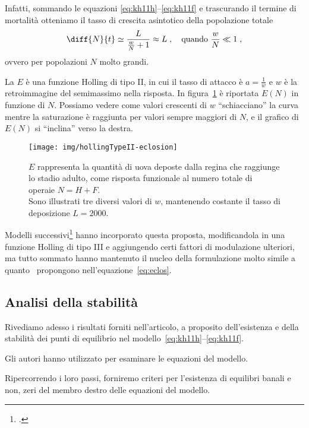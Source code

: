 Infatti, sommando le equazioni \eqref{eq:kh11h}--\eqref{eq:kh11f} e trascurando il termine di mortalità otteniamo
il tasso di crescita asintotico della popolazione totale
$$\diff{N}{t} \simeq \frac{L}{ \frac{w}{N} + 1} \approx L \; , \quad \text{quando } \frac{w}{N} \ll 1 \; ,$$
ovvero per popolazioni $N$ molto grandi.

La $E$ è una funzione Holling di tipo II, in cui il tasso di attacco è $a=\frac{1}{w}$ e $w$
è la retroimmagine del semimassimo nella risposta. In figura~\ref{img:eclos} è riportata $E(N)$ in funzione di $N$.
Possiamo vedere come valori
crescenti di $w$ ``schiacciano'' la curva mentre la saturazione è raggiunta per valori sempre maggiori di $N$,
e il grafico di $E(N)$ si ``inclina'' verso la destra.

\begin{figure}[pbh]
    \centering
    \texttt{[image: img/hollingTypeII-eclosion]}

    \caption[Schiusa, Holling tipo II]{$E$ rappresenta la quantità di uova deposte dalla regina che raggiunge lo
    stadio adulto, come risposta funzionale al numero totale di operaie $N=H+F$.
    \\
    Sono illustrati tre diversi valori di $w$, mantenendo costante il tasso di deposizione $L=2000$.}
    \label{img:eclos}
\end{figure}

Modelli successivi\footcite{ratti2017} hanno incorporato questa proposta, modificandola in una funzione Holling
di tipo III e aggiungendo certi fattori di modulazione ulteriori, ma tutto sommato hanno mantenuto il nucleo
della formulazione molto simile a quanto~\citeauthor{khoury2011} propongono nell'equazione~\eqref{eq:eclos}.


\subsection{Analisi della stabilità}
Rivediamo adesso i risultati forniti nell'articolo, a proposito dell'esistenza e della stabilità
dei punti di equilibrio nel modello~\eqref{eq:kh11h}--\eqref{eq:kh11f}.

Gli autori hanno utilizzato  per esaminare le equazioni del modello.

Ripercorrendo i loro passi, forniremo criteri per l'esistenza di equilibri banali e non, \ie zeri del membro
destro delle equazioni del modello.

